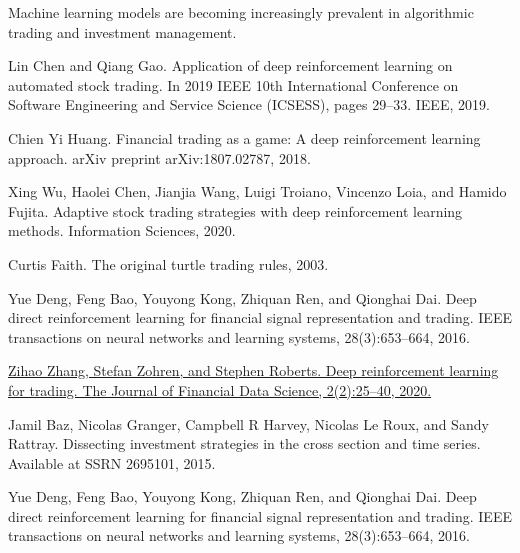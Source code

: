 \documentclass[a4paper,14pt]{extarticle}
\begin{document}
\newpage

\begin{thebibliography}{0}
	\hypertarget{1}{}
	{Machine learning models are becoming increasingly prevalent in algorithmic trading and investment management.}
 

    \hypertarget{2}{}
	{Lin Chen and Qiang Gao. Application of deep reinforcement learning on automated stock trading. In 2019 IEEE 10th International Conference on Software Engineering and Service Science (ICSESS), pages 29–33. IEEE, 2019.}

    \hypertarget{3}{}
	{Chien Yi Huang. Financial trading as a game: A deep reinforcement learning approach. arXiv preprint arXiv:1807.02787, 2018.}

    \hypertarget{4}{}
	{Xing Wu, Haolei Chen, Jianjia Wang, Luigi Troiano, Vincenzo Loia, and Hamido Fujita. Adaptive stock trading strategies with deep reinforcement learning methods. Information Sciences, 2020.}

    \hypertarget{5}{}
	{Curtis Faith. The original turtle trading rules, 2003.}

    \hypertarget{6}{}
	{Yue Deng, Feng Bao, Youyong Kong, Zhiquan Ren, and Qionghai Dai. Deep direct reinforcement learning for financial signal representation and trading. IEEE transactions on neural networks and learning systems, 28(3):653–664, 2016.}

    \hypertarget{7}{}
    \href{}
	{Zihao Zhang, Stefan Zohren, and Stephen Roberts. Deep reinforcement learning for trading. The Journal of Financial Data Science, 2(2):25–40, 2020.}

    \hypertarget{8}{}

	{Jamil Baz, Nicolas Granger, Campbell R Harvey, Nicolas Le Roux, and Sandy Rattray. Dissecting investment strategies in the cross section and time series. Available at SSRN 2695101, 2015.}

    \hypertarget{9}{}

	{Yue Deng, Feng Bao, Youyong Kong, Zhiquan Ren, and Qionghai Dai. Deep direct reinforcement learning for financial signal representation and trading. IEEE transactions on neural networks and learning systems, 28(3):653–664, 2016.}


\end{thebibliography}
\end{document}
